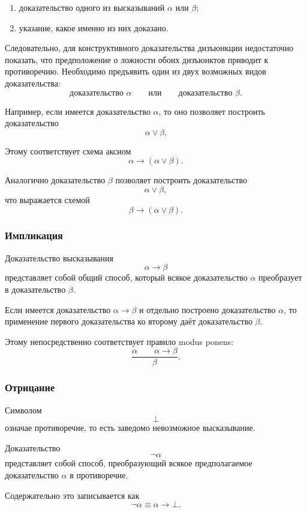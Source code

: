 \documentclass[12pt,a4paper,oneside,openany]{book}
\theoremstyle{definition}
\theoremstyle{plain}
\theoremstyle{remark}
\begin{document}
\begin{enumerate}
    \item доказательство одного из высказываний
          \(\alpha\) или \(\beta\);
    \item указание, какое именно из них доказано.
\end{enumerate}

Следовательно, для конструктивного доказательства дизъюнкции
недостаточно показать, что предположение о ложности обоих дизъюнктов
приводит к противоречию. Необходимо предъявить один из двух возможных
видов доказательства:
\[
\text{доказательство }\alpha
\qquad\text{или}\qquad
\text{доказательство }\beta.
\]

Например, если имеется доказательство \(\alpha\), то оно позволяет
построить доказательство
\[
\alpha\lor\beta.
\]

Этому соответствует схема аксиом
\[
\alpha\to(\alpha\lor\beta).
\]

Аналогично доказательство \(\beta\) позволяет построить доказательство
\[
\alpha\lor\beta,
\]
что выражается схемой
\[
\beta\to(\alpha\lor\beta).
\]

\subsubsection{Импликация}

Доказательство высказывания
\[
\alpha\to\beta
\]
представляет собой общий способ, который всякое доказательство
\(\alpha\) преобразует в доказательство \(\beta\).

Если имеется доказательство \(\alpha\to\beta\) и отдельно построено
доказательство \(\alpha\), то применение первого доказательства ко
второму даёт доказательство \(\beta\).

Этому непосредственно соответствует правило modus ponens:
\[
\frac{\alpha\qquad\alpha\to\beta}{\beta}.
\]

\subsubsection{Отрицание}

Символом
\[
\bot
\]
означае противоречие, то есть заведомо невозможное высказывание.


Доказательство
\[
\neg\alpha
\]
представляет собой способ, преобразующий всякое предполагаемое
доказательство \(\alpha\) в противоречие.

Содержательно это записывается как
\[
\neg\alpha\equiv\alpha\to\bot.
\]
\end{document}

